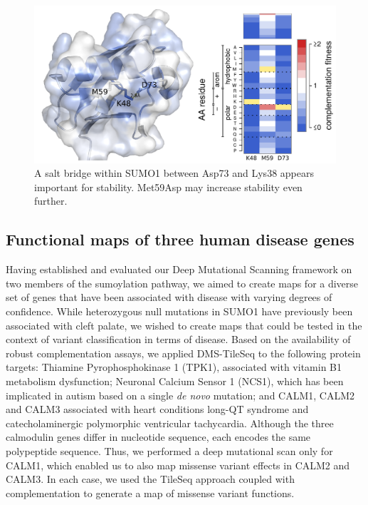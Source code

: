 \begin{figure}[h!]
	\centering
	\includegraphics[width=\textwidth]{img/saltbridge.pdf}
	\caption{A salt bridge within SUMO1 between Asp73 and Lys38 appears important for stability. Met59Asp may increase stability even further.}
	\label{fig:saltbridge}
\end{figure}






\subsection{Functional maps of three human disease genes}

Having established and evaluated our Deep Mutational Scanning framework on two members of the sumoylation pathway, we aimed to create maps for a diverse set of genes that have been associated with disease with varying degrees of confidence. While  heterozygous null mutations in SUMO1 have previously been associated with cleft palate, we wished to create maps that could be tested in the context of variant classification in terms of disease. Based on the availability of robust complementation assays, we applied DMS-TileSeq to the following protein targets: Thiamine Pyrophosphokinase 1 (TPK1), associated with vitamin B1 metabolism dysfunction; Neuronal Calcium Sensor 1 (NCS1), which has been implicated in autism based on a single \textit{de novo} mutation;  and CALM1, CALM2 and CALM3 associated with heart conditions long-QT syndrome and catecholaminergic polymorphic ventricular tachycardia. Although the three calmodulin genes differ in nucleotide sequence, each encodes the same polypeptide sequence. Thus, we performed a deep mutational scan only for CALM1, which enabled us to also map missense variant effects in CALM2 and CALM3. In each case, we used the TileSeq approach coupled with complementation to generate a map of missense variant functions. 



